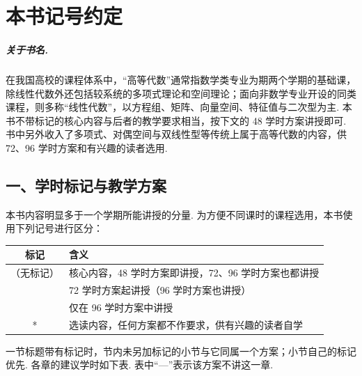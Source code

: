 
\chapter*{本书记号约定}

\paragraph*{关于书名.} 在我国高校的课程体系中，“高等代数”通常指数学类专业为期两个学期的基础课，除线性代数外还包括较系统的多项式理论和空间理论；面向非数学专业开设的同类课程，则多称“线性代数”，以方程组、矩阵、向量空间、特征值与二次型为主. 本书不带标记的核心内容与后者的教学要求相当，按下文的 48 学时方案讲授即可. 书中另外收入了多项式、对偶空间与双线性型等传统上属于高等代数的内容，供 72、96 学时方案和有兴趣的读者选用.

\section*{一、学时标记与教学方案}

本书内容明显多于一个学期所能讲授的分量. 为方便不同课时的课程选用，本书使用下列记号进行区分：

\begin{center}
	\begin{tabular}{cl}
		\toprule
		标记 & 含义 \\
		\midrule
		（无标记） & 核心内容，48 学时方案即讲授，72、96 学时方案也都讲授 \\
		\textdagger & 72 学时方案起讲授（96 学时方案也讲授） \\
		\textdaggerdbl & 仅在 96 学时方案中讲授 \\
		* & 选读内容，任何方案都不作要求，供有兴趣的读者自学 \\
		\bottomrule
	\end{tabular}
\end{center}

一节标题带有标记时，节内未另加标记的小节与它同属一个方案；小节自己的标记优先. 各章的建议学时如下表. 表中“—”表示该方案不讲这一章.

